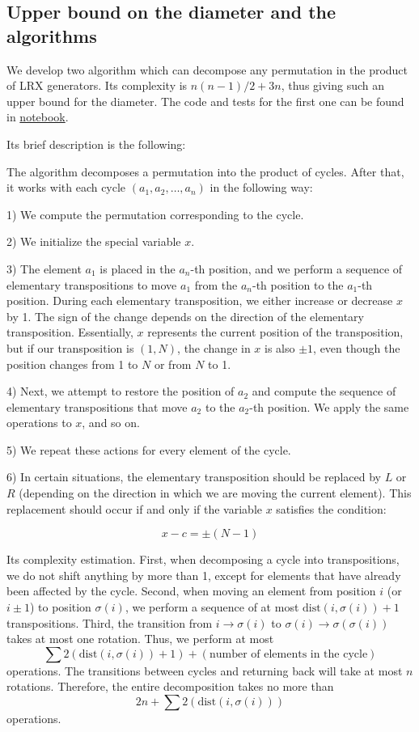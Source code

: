 \documentclass[atmp]{ipart_v1}
\numberwithin{equation}{section}
\theoremstyle{plain}%
\begin{document}
\subsection{Upper bound on the diameter and the algorithms }
We develop two algorithm which can decompose any permutation in the product of LRX generators. Its complexity is  $n(n-1)/2+3n$, thus giving such an upper bound for the diameter.  The code and tests for the first one can be found in \href{https://www.kaggle.com/code/mixnota/article-project}{notebook}.

Its brief description is the following:

The algorithm decomposes a permutation into the product of cycles. After that, it works with each cycle \( (a_1, a_2, \dots, a_n) \) in the following way:

1) We compute the permutation corresponding to the cycle.

2) We initialize the special variable \( x \).

3) The element \( a_1 \) is placed in the \( a_n \)-th position, and we perform a sequence of elementary transpositions to move \( a_1 \) from the \( a_n \)-th position to the \( a_1 \)-th position. During each elementary transposition, we either increase or decrease \( x \) by 1. The sign of the change depends on the direction of the elementary transposition. Essentially, \( x \) represents the current position of the transposition, but if our transposition is \( (1, N) \), the change in \( x \) is also \( \pm1 \), even though the position changes from 1 to \( N \) or from \( N \) to 1.

4) Next, we attempt to restore the position of \( a_2 \) and compute the sequence of elementary transpositions that move \( a_2 \) to the \( a_2 \)-th position. We apply the same operations to \( x \), and so on.

5) We repeat these actions for every element of the cycle.

6) In certain situations, the elementary transposition should be replaced by \( L \) or \( R \) (depending on the direction in which we are moving the current element). This replacement should occur if and only if the variable \( x \) satisfies the condition:

\[
x - c = \pm (N - 1)
\]


Its complexity estimation.
First, when decomposing a cycle into transpositions, we do not shift anything by more than 1, except for elements that have already been affected by the cycle.
Second, when moving an element from position \( i \) (or \( i \pm 1 \)) to position \( \sigma(i) \), we perform a sequence of at most \( \text{dist}(i, \sigma(i)) + 1 \) transpositions.
Third, the transition from \( i \to \sigma(i) \) to \( \sigma(i) \to \sigma(\sigma(i)) \) takes at most one rotation.
Thus, we perform at most  
\[
\sum 2(\text{dist}(i, \sigma(i)) + 1) + (\text{number of elements in the cycle})
\]
operations. The transitions between cycles and returning back will take at most \( n \) rotations.
Therefore, the entire decomposition takes no more than  
\[
2n + \sum 2(\text{dist}(i, \sigma(i)))
\]
operations.
\end{document}
